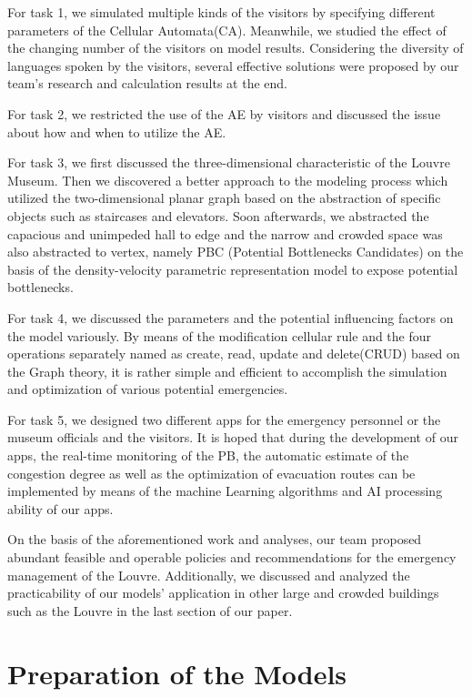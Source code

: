 \documentclass[12pt]{article}
\begin{document}
For task 1, we simulated multiple kinds of the visitors by specifying different parameters of the Cellular Automata(CA). Meanwhile, we studied the effect of the changing number of the visitors on model results. Considering the diversity of languages spoken by the visitors, several effective solutions were proposed by our team's research and calculation results at the end.

For task 2, we restricted the use of the AE by visitors and discussed the issue about how and when to utilize the AE. 

For task 3, we first discussed the three-dimensional characteristic of the Louvre Museum. Then we discovered a better approach to the modeling process which utilized the two-dimensional planar graph based on the abstraction of specific objects such as staircases and elevators. Soon afterwards, we abstracted the capacious and unimpeded hall to edge and the narrow and crowded space was also abstracted to vertex, namely PBC (Potential Bottlenecks Candidates) on the basis of the density-velocity parametric representation model to expose potential bottlenecks. 

For task 4, we discussed the parameters and the potential influencing 
factors on the model variously. By means of the modification cellular rule and the four 
operations separately named as create, read, update and delete(CRUD) based 
on the Graph theory, it is rather simple and efficient to accomplish the simulation and optimization of various potential emergencies.

For task 5, we designed two different apps for the emergency personnel or the museum officials and the visitors. It is hoped that during the development of our apps, the real-time monitoring of the PB, the automatic estimate of the congestion degree as well as the optimization of evacuation routes can be implemented by means of the machine Learning algorithms and AI processing ability of our apps.

On the basis of the aforementioned work and analyses, our team proposed abundant feasible and operable policies and recommendations for the emergency management of the Louvre. Additionally, we discussed and analyzed the practicability of our models' application in other large and crowded buildings such as the Louvre in the last section of our paper.




\section{Preparation of the Models}
\end{document}
